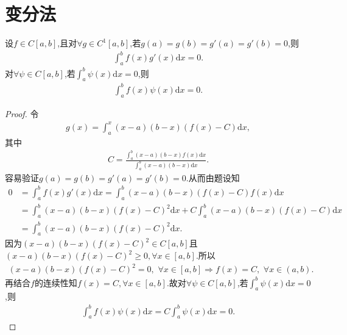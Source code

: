 \documentclass[../../main.tex]{subfiles}%
\begin{document}
\section{变分法}

\begin{example}
设$f\in C[a,b]$,且对$\forall g\in C^1[a,b]$,若$g(a)=g(b)=g'(a)=g'(b)=0$,则
\begin{align*}
\int_a^b f(x)g'(x)\mathrm{d}x=0.
\end{align*}
对$\forall \psi\in C[a,b]$,若$\int_a^b \psi(x)\mathrm{d}x=0$,则
\begin{align*}
\int_a^b f(x)\psi(x)\mathrm{d}x=0.
\end{align*}
\end{example}
\begin{proof}
令
\begin{align*}
g(x)=\int_a^x (x-a)(b-x)\left(f(x)-C\right)\mathrm{d}x,
\end{align*}
其中
\begin{align*}
C=\frac{\int_a^b (x-a)(b-x)f(x)\mathrm{d}x}{\int_a^b (x-a)(b-x)\mathrm{d}x}.
\end{align*}
容易验证$g(a)=g(b)=g'(a)=g'(b)=0$.从而由题设知
\begin{align*}
0&=\int_a^b f(x)g'(x)\mathrm{d}x=\int_a^b (x-a)(b-x)\left(f(x)-C\right)f(x)\mathrm{d}x\\
&=\int_a^b (x-a)(b-x)\left(f(x)-C\right)^2\mathrm{d}x+C\int_a^b (x-a)(b-x)\left(f(x)-C\right)\mathrm{d}x\\
&=\int_a^b (x-a)(b-x)\left(f(x)-C\right)^2\mathrm{d}x.
\end{align*}
因为$(x-a)(b-x)\left(f(x)-C\right)^2\in C[a,b]$且$(x-a)(b-x)\left(f(x)-C\right)^2\geqslant 0,\forall x\in [a,b]$.所以
\begin{align*}
(x-a)(b-x)\left(f(x)-C\right)^2=0,\,\,\forall x\in [a,b] \Longrightarrow f(x)=C,\,\,\forall x\in (a,b).
\end{align*}
再结合$f$的连续性知$f(x)=C,\forall x\in [a,b]$.故对$\forall \psi\in C[a,b]$,若$\int_a^b \psi(x)\mathrm{d}x=0$,则
\begin{align*}
\int_a^b f(x)\psi(x)\mathrm{d}x=C\int_a^b \psi(x)\mathrm{d}x=0.
\end{align*}
\end{proof}
\end{document}
